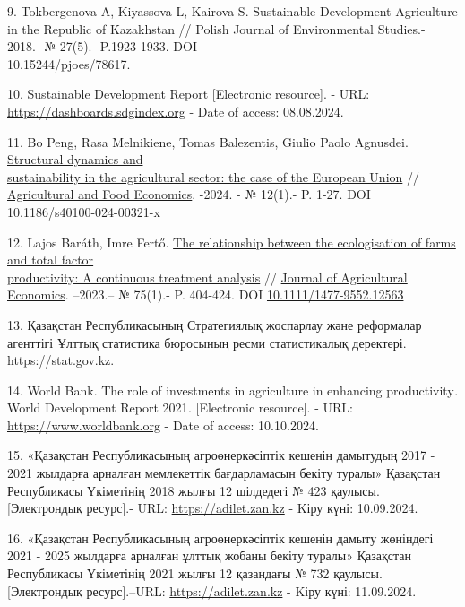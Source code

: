 \begin{references}
9. Tokbergenova A, Kiyassova L, Kairova S. Sustainable Development
Agriculture in the Republic of Kazakhstan // Polish Journal of
Environmental Studies.- 2018.- № 27(5).- P.1923-1933.
DOI \\10.15244/pjoes/78617.

10. Sustainable Development Report {[}Electronic resource{]}. -
URL: \href{https://dashboards.sdgindex.org}{https://dashboards.sdgindex.org} - Date of access: 08.08.2024.

11. Bo Peng, Rasa Melnikiene, Tomas Balezentis, Giulio Paolo Agnusdei.
\href{https://ideas.repec.org/a/spr/agfoec/v12y2024i1d10.1186_s40100-024-00321-x.html}{Structural
dynamics and \\sustainability in the agricultural sector: the case of the
European Union} //
\href{https://ideas.repec.org/s/spr/agfoec.html}{Agricultural and Food
Economics}. -2024. - № 12(1).- P. 1-27. DOI 10.1186/s40100-024-00321-x

12. Lajos Baráth, Imre Fertő.
\href{https://ideas.repec.org/a/bla/jageco/v75y2024i1p404-424.html}{The
relationship between the ecologisation of farms and total factor\\
productivity: A continuous treatment analysis} //
\href{https://ideas.repec.org/s/bla/jageco.html}{Journal of Agricultural
Economics}. --2023.-- № 75(1).- P. 404-424. DOI
\href{http://dx.doi.org/10.1111/1477-9552.12563}{10.1111/1477-9552.12563}

13. Қазақстан Республикасының Стратегиялық жоспарлау және реформалар
агенттігі Ұлттық статистика бюросының ресми статистикалық деректері.
https://stat.gov.kz.

14. World Bank. The role of investments in agriculture in
enhancing productivity\emph{.} World Development Report 2021\emph{.}
{[}Electronic resource{]}. -
URL: \href{https://www.worldbank.org/en/publication/wdr2021}{https://www.worldbank.org} - Date of
access: 10.10.2024.

15. «Қазақстан Республикасының агроөнеркәсіптік кешенін дамытудың 2017 -
2021 жылдарға арналған мемлекеттік бағдарламасын бекіту туралы»
Қазақстан Республикасы Үкіметінің 2018 жылғы 12 шілдедегі № 423 қаулысы.
{[}Электрондық ресурс{]}.- URL:
\href{https://adilet.zan.kz/rus/docs/P1800000423}{https://adilet.zan.kz} - Kіру күні:
10.09.2024.

16. «Қазақстан Республикасының агроөнеркәсіптік кешенін дамыту жөніндегі
2021 - 2025 жылдарға арналған ұлттық жобаны бекіту туралы» Қазақстан
Республикасы Үкіметінің 2021 жылғы 12 қазандағы № 732 қаулысы.
{[}Электрондық ресурс{]}.--URL:
\href{https://adilet.zan.kz/kaz/docs/P2100000732}{https://adilet.zan.kz} - Kіру күні: 11.09.2024.


\end{references}
